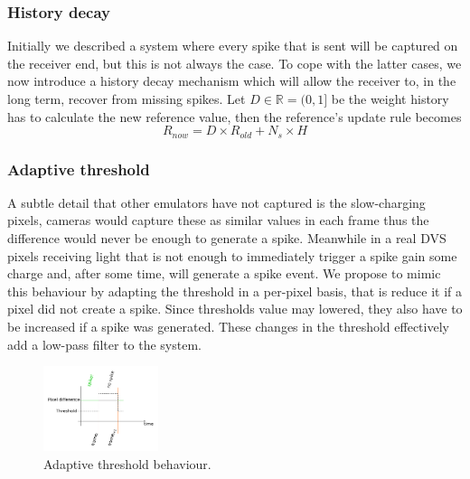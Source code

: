 \documentclass[twocolumn]{article}
\begin{document}
\subsubsection{History decay} %

Initially we described a system where every spike that is sent will be captured on the receiver end, but this is not always the case. To cope with the latter cases, we now introduce a history decay mechanism which will allow the receiver to, in the long term, recover from missing spikes. Let $D \in \mathbb{R} = (0, 1]$ be the weight history has to calculate the new reference value, then the reference's update rule becomes
\begin{equation}
\label{eq:ref_update_decay}
R_{now} = D\times R_{old} + N_{s}\times H
\end{equation}

%

\subsubsection{Adaptive threshold} 
A subtle detail that other emulators have not captured is the slow-charging pixels, cameras would capture these as similar values in each frame thus the difference would never be enough to generate a spike. Meanwhile in a real DVS pixels receiving light that is not enough to immediately trigger a spike gain some charge and, after some time, will generate a spike event. We propose to mimic this behaviour by adapting the threshold in a per-pixel basis, that is reduce it if a pixel did not create a spike. Since thresholds value may lowered, they also have to be increased if a spike was generated. These changes in the threshold effectively add a low-pass filter to the system. 

%
\begin{figure}
  \centering
  \includegraphics[width=0.3\textwidth]{adaptive_thresh}
  \caption{Adaptive threshold behaviour.}
  \label{fig:adpt_thresh}
\end{figure}
\end{document}
